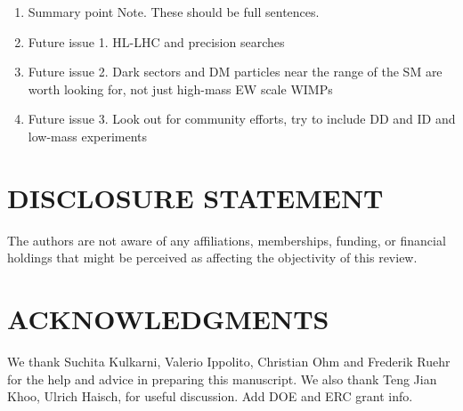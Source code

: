 \documentclass{ar-1col}
\begin{document}
\begin{issues}
\begin{enumerate}
\item Summary point Note. These should be full sentences.
\item Future issue 1. HL-LHC and precision searches
\item Future issue 2. Dark sectors and DM particles near the range of the SM are worth looking for, not just high-mass EW scale WIMPs
\item Future issue 3. Look out for community efforts, try to include DD and ID and low-mass experiments 
\end{enumerate}
\end{issues}

\section*{DISCLOSURE STATEMENT}
The authors are not aware of any affiliations, memberships, funding, or financial holdings that
might be perceived as affecting the objectivity of this review. 

\section*{ACKNOWLEDGMENTS}
We thank Suchita Kulkarni, Valerio Ippolito, Christian Ohm and Frederik Ruehr for the help and advice in preparing this manuscript. 
We also thank Teng Jian Khoo, Ulrich Haisch, for useful discussion.
Add DOE and ERC grant info. 
%



\end{document}
